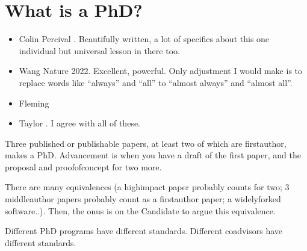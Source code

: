 \documentclass[letterpaper,10pt,english]{sphinxmanual}
\begin{document}
\chapter{What is a PhD?}
\label{\detokenize{04WhatIsAPhD:what-is-a-phd}}\label{\detokenize{04WhatIsAPhD::doc}}\begin{itemize}
\item {} 
\sphinxAtStartPar
Colin Percival . Beautifully written, a lot of specifics about this one individual but universal lesson in there too.

\item {} 
\sphinxAtStartPar
Wang Nature  2022. Excellent, powerful. Only adjustment I would make is to replace words like “always” and “all” to “almost always” and “almost all”.

\item {} 
\sphinxAtStartPar
Fleming 

\item {} 
\sphinxAtStartPar
Taylor . I agree with all of these.

\end{itemize}

\sphinxAtStartPar
Three published or publishable papers, at least two of which are first\sphinxhyphen{}author, makes a PhD. Advancement is when you have a draft of the first paper, and the proposal and proof\sphinxhyphen{}of\sphinxhyphen{}concept for two more.

\sphinxAtStartPar
There are many equivalences (a high\sphinxhyphen{}impact paper probably counts for two; 3 middle\sphinxhyphen{}author papers probably count as a first\sphinxhyphen{}author paper; a widely\sphinxhyphen{}forked software..). Then, the onus is on the Candidate to argue this equivalence.

\sphinxAtStartPar
Different PhD programs have different standards.
Different co\sphinxhyphen{}advisors have different standards.
\end{document}
